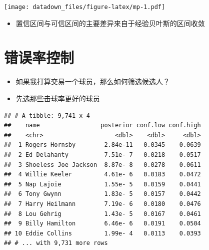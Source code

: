\documentclass[
]{book}
\newenvironment{Shaded}{\begin{snugshade}}{\end{snugshade}}
\newcommand{\CommentTok}[1]{\textcolor[rgb]{0.56,0.35,0.01}{\textit{#1}}}
\newcommand{\KeywordTok}[1]{\textcolor[rgb]{0.13,0.29,0.53}{\textbf{#1}}}
\newcommand{\NormalTok}[1]{#1}
\newcommand{\OperatorTok}[1]{\textcolor[rgb]{0.81,0.36,0.00}{\textbf{#1}}}
\newcommand{\StringTok}[1]{\textcolor[rgb]{0.31,0.60,0.02}{#1}}
\providecommand{\tightlist}{%
  \setlength{\itemsep}{0pt}\setlength{\parskip}{0pt}}
\begin{document}
\texttt{[image: datadown\_files/figure-latex/mp-1.pdf]}

\begin{itemize}
\tightlist
\item
  置信区间与可信区间的主要差异来自于经验贝叶斯的区间收敛
\end{itemize}

\hypertarget{ux9519ux8befux7387ux63a7ux5236}{%
\section{错误率控制}\label{ux9519ux8befux7387ux63a7ux5236}}

\begin{itemize}
\item
  如果我打算交易一个球员，那么如何筛选候选人？
\item
  先选那些击球率更好的球员
\end{itemize}

\begin{Shaded}
\end{Shaded}

\begin{verbatim}
## # A tibble: 9,741 x 4
##    name                 posterior conf.low conf.high
##    <chr>                    <dbl>    <dbl>     <dbl>
##  1 Rogers Hornsby        2.84e-11   0.0345    0.0639
##  2 Ed Delahanty          7.51e- 7   0.0218    0.0517
##  3 Shoeless Joe Jackson  8.87e- 8   0.0278    0.0611
##  4 Willie Keeler         4.61e- 6   0.0183    0.0472
##  5 Nap Lajoie            1.55e- 5   0.0159    0.0441
##  6 Tony Gwynn            1.83e- 5   0.0157    0.0442
##  7 Harry Heilmann        7.19e- 6   0.0180    0.0476
##  8 Lou Gehrig            1.43e- 5   0.0167    0.0461
##  9 Billy Hamilton        6.46e- 6   0.0191    0.0504
## 10 Eddie Collins         1.99e- 4   0.0113    0.0393
## # ... with 9,731 more rows
\end{verbatim}
\end{document}
